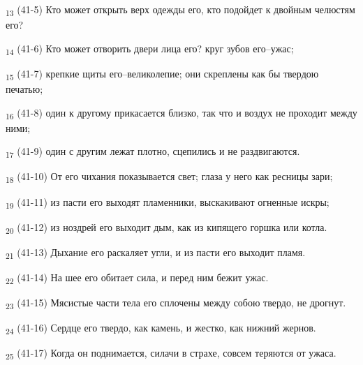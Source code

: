 \begin{tcolorbox}
\textsubscript{13} (41-5) Кто может открыть верх одежды его, кто подойдет к двойным челюстям его?
\end{tcolorbox}
\begin{tcolorbox}
\textsubscript{14} (41-6) Кто может отворить двери лица его? круг зубов его--ужас;
\end{tcolorbox}
\begin{tcolorbox}
\textsubscript{15} (41-7) крепкие щиты его--великолепие; они скреплены как бы твердою печатью;
\end{tcolorbox}
\begin{tcolorbox}
\textsubscript{16} (41-8) один к другому прикасается близко, так что и воздух не проходит между ними;
\end{tcolorbox}
\begin{tcolorbox}
\textsubscript{17} (41-9) один с другим лежат плотно, сцепились и не раздвигаются.
\end{tcolorbox}
\begin{tcolorbox}
\textsubscript{18} (41-10) От его чихания показывается свет; глаза у него как ресницы зари;
\end{tcolorbox}
\begin{tcolorbox}
\textsubscript{19} (41-11) из пасти его выходят пламенники, выскакивают огненные искры;
\end{tcolorbox}
\begin{tcolorbox}
\textsubscript{20} (41-12) из ноздрей его выходит дым, как из кипящего горшка или котла.
\end{tcolorbox}
\begin{tcolorbox}
\textsubscript{21} (41-13) Дыхание его раскаляет угли, и из пасти его выходит пламя.
\end{tcolorbox}
\begin{tcolorbox}
\textsubscript{22} (41-14) На шее его обитает сила, и перед ним бежит ужас.
\end{tcolorbox}
\begin{tcolorbox}
\textsubscript{23} (41-15) Мясистые части тела его сплочены между собою твердо, не дрогнут.
\end{tcolorbox}
\begin{tcolorbox}
\textsubscript{24} (41-16) Сердце его твердо, как камень, и жестко, как нижний жернов.
\end{tcolorbox}
\begin{tcolorbox}
\textsubscript{25} (41-17) Когда он поднимается, силачи в страхе, совсем теряются от ужаса.
\end{tcolorbox}
